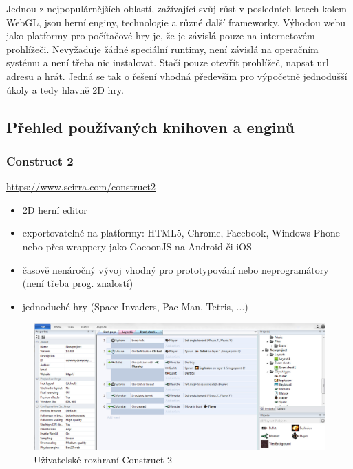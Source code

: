 \documentclass[12pt,a4paper,titlepage,final]{report}
\begin{document}
Jednou z nejpopulárnějších oblastí, zažívající svůj růst v posledních letech kolem WebGL, jsou herní enginy, technologie a různé další frameworky. Výhodou webu jako platformy pro počítačové hry je, že je závislá pouze na internetovém prohlížeči. Nevyžaduje žádné speciální runtimy, není závislá na operačním systému a není třeba nic instalovat. Stačí pouze otevřít prohlížeč, napsat url adresu a hrát. Jedná se tak o řešení vhodná především pro výpočetně jednodušší úkoly a tedy hlavně 2D hry.

\subsection{Přehled používaných knihoven a enginů}

\subsubsection{Construct 2}

\url{https://www.scirra.com/construct2}

\begin{itemize}
	\item 2D herní editor
	\item exportovatelné na platformy: HTML5, Chrome, Facebook, Windows Phone nebo přes wrappery jako CocoonJS na Android či iOS
	\item časově nenáročný vývoj vhodný pro prototypování nebo neprogramátory (není třeba prog. znalostí)
	\item jednoduché hry (Space Invaders, Pac-Man, Tetris, ...)
\end{itemize}

\begin{figure}[ht]
\begin{center}
\includegraphics[width=14cm]{images/construct2.jpg}
\caption{Uživatelské rozhraní Construct 2}
\label{fig:theory}
\end{center}
\end{figure}
\end{document}
